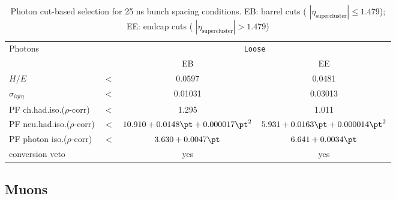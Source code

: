  \begin{table}[htb]
  \centering
     \begin{tabular}{lccc}
      \hline
      \hline
 
     Photons                                   &       & \multicolumn{2}{c}{\texttt{Loose}}\\
                                               &       & EB      & EE  \\
  \hline
     $H/E $                                    & $ < $ &0.0597   & 0.0481      \\
     $\sigma_{i\eta i\eta} $                   & $ < $ &0.01031  & 0.03013   \\
     PF ch.had.iso.($\rho$-corr)               & $ < $ &1.295    & 1.011   \\
     PF neu.had.iso.($\rho$-corr)              & $ < $ &$10.910+0.0148\pt+0.000017\pt^2$    &$5.931+0.0163\pt+0.000014\pt^2 $   \\
     PF photon iso.($\rho$-corr)               & $ < $ &$3.630+0.0047\pt$                 &$6.641+0.0034\pt $   \\
     conversion veto                           &       & yes     &yes     \\
  \hline
 \end{tabular}
  \caption{Photon cut-based selection for 25 ns bunch spacing conditions. EB: barrel cuts ( $|\eta_\text{supercluster}| \leq 1.479$); EE: endcap cuts ( $|\eta_\text{supercluster}| > 1.479$)}\label{tab:PhotonId}
 \end{table}


\subsection{Muons}\label{ssec:muons}


